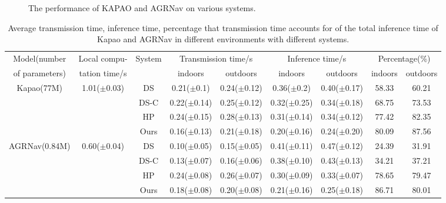 \begin{figure}[htp]
    \caption{The performance of KAPAO and AGRNav on various systems.}
    \label{fig:end2end} 
\end{figure}





\begin{table}[htb]
    
    \renewcommand\arraystretch{0.95}
    \centering
\begin{tabular}{ccc|c|c|c|c|c|c}
\toprule
Model(number & Local compu- & \multirow[c]{2}{*}{System} & \multicolumn{2}{|c|}{Transmission time/s} & \multicolumn{2}{|c|}{Inference time/s} & \multicolumn{2}{c}{Percentage(\%)} \\
of parameters)& tation time/s &  & indoors & outdoors & indoors & outdoors & indoors & outdoors \\
\midrule
\multirow[c]{4}{*}{Kapao(77M)} & \multirow[c]{4}{*}{1.01($\pm$0.03)} & DS & 0.21($\pm$0.1) & 0.24($\pm$0.12) & 0.36($\pm$0.2) & 0.40($\pm$0.17) & 58.33 & 60.21 \\
 &  & DS-C & 0.22($\pm$0.14) & 0.25($\pm$0.12) & 0.32($\pm$0.25) & 0.34($\pm$0.18) & 68.75 & 73.53 \\
 &  & HP & 0.24($\pm$0.15) & 0.28($\pm$0.13) & 0.31($\pm$0.14) & 0.34($\pm$0.12) & 77.42 & 82.35 \\
 &  & Ours & 0.16($\pm$0.13) & 0.21($\pm$0.18) & 0.20($\pm$0.16) & 0.24($\pm$0.20) & 80.09 & 87.56 \\
\cline{1-9} \cline{2-9}
\multirow[c]{4}{*}{AGRNav(0.84M)} & \multirow[c]{4}{*}{0.60($\pm$0.04)} & DS & 0.10($\pm$0.05) & 0.15($\pm$0.05) & 0.41($\pm$0.11) & 0.47($\pm$0.12) & 24.39 & 31.91\\
 &  & DS-C & 0.13($\pm$0.07) & 0.16($\pm$0.06) & 0.38($\pm$0.10) & 0.43($\pm$0.13) & 34.21 & 37.21\\
 &  & HP & 0.24($\pm$0.08) & 0.26($\pm$0.07) & 0.30($\pm$0.09) & 0.33($\pm$0.07) & 78.65 & 79.47 \\
 &  & Ours & 0.18($\pm$0.08) & 0.20($\pm$0.08) & 0.21($\pm$0.16) & 0.25($\pm$0.18) & 86.71 & 80.01 \\
\cline{1-9} \cline{2-9}
\bottomrule
\end{tabular}

    \caption{Average transmission time, inference time, percentage that transmission time accounts for of the total inference time of Kapao and AGRNav in different environments with different systems.}
    \label{tab:e2e_time}
\end{table}

